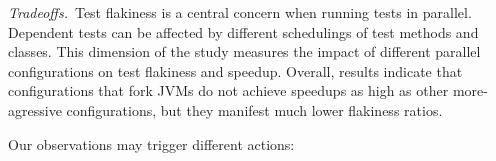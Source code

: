 
\noindent\emph{Tradeoffs.}~Test flakiness is a central
concern when running tests in parallel.  Dependent tests
can be affected by different schedulings of test methods and classes.
This dimension of the study measures the impact of different parallel
configurations on test flakiness and speedup.  Overall, results
indicate that configurations that fork JVMs do not achieve
speedups as high as other more-agressive configurations, but they
manifest much lower flakiness ratios.

Our observations may trigger different actions:

